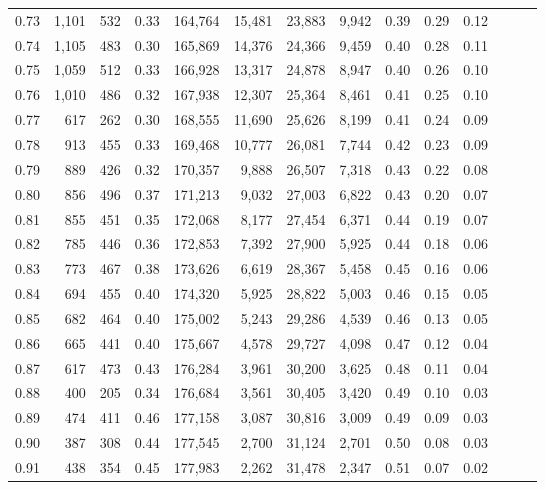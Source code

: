 \begin{tabular}{rrrrrrrrrrrrrr}
0.73 &  1,101 &  532 &  0.33 &  164,764 &   15,481 &  23,883 &   9,942 &  0.39 &  0.29 &      0.12 \\
0.74 &  1,105 &  483 &  0.30 &  165,869 &   14,376 &  24,366 &   9,459 &  0.40 &  0.28 &      0.11 \\
0.75 &  1,059 &  512 &  0.33 &  166,928 &   13,317 &  24,878 &   8,947 &  0.40 &  0.26 &      0.10 \\
0.76 &  1,010 &  486 &  0.32 &  167,938 &   12,307 &  25,364 &   8,461 &  0.41 &  0.25 &      0.10 \\
0.77 &    617 &  262 &  0.30 &  168,555 &   11,690 &  25,626 &   8,199 &  0.41 &  0.24 &      0.09 \\
0.78 &    913 &  455 &  0.33 &  169,468 &   10,777 &  26,081 &   7,744 &  0.42 &  0.23 &      0.09 \\
0.79 &    889 &  426 &  0.32 &  170,357 &    9,888 &  26,507 &   7,318 &  0.43 &  0.22 &      0.08 \\
0.80 &    856 &  496 &  0.37 &  171,213 &    9,032 &  27,003 &   6,822 &  0.43 &  0.20 &      0.07 \\
0.81 &    855 &  451 &  0.35 &  172,068 &    8,177 &  27,454 &   6,371 &  0.44 &  0.19 &      0.07 \\
0.82 &    785 &  446 &  0.36 &  172,853 &    7,392 &  27,900 &   5,925 &  0.44 &  0.18 &      0.06 \\
0.83 &    773 &  467 &  0.38 &  173,626 &    6,619 &  28,367 &   5,458 &  0.45 &  0.16 &      0.06 \\
0.84 &    694 &  455 &  0.40 &  174,320 &    5,925 &  28,822 &   5,003 &  0.46 &  0.15 &      0.05 \\
0.85 &    682 &  464 &  0.40 &  175,002 &    5,243 &  29,286 &   4,539 &  0.46 &  0.13 &      0.05 \\
0.86 &    665 &  441 &  0.40 &  175,667 &    4,578 &  29,727 &   4,098 &  0.47 &  0.12 &      0.04 \\
0.87 &    617 &  473 &  0.43 &  176,284 &    3,961 &  30,200 &   3,625 &  0.48 &  0.11 &      0.04 \\
0.88 &    400 &  205 &  0.34 &  176,684 &    3,561 &  30,405 &   3,420 &  0.49 &  0.10 &      0.03 \\
0.89 &    474 &  411 &  0.46 &  177,158 &    3,087 &  30,816 &   3,009 &  0.49 &  0.09 &      0.03 \\
0.90 &    387 &  308 &  0.44 &  177,545 &    2,700 &  31,124 &   2,701 &  0.50 &  0.08 &      0.03 \\
0.91 &    438 &  354 &  0.45 &  177,983 &    2,262 &  31,478 &   2,347 &  0.51 &  0.07 &      0.02 \\

\end{tabular}
